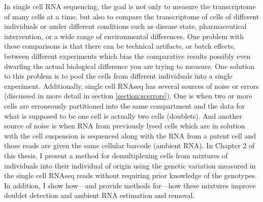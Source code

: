 \par{
In single cell RNA sequencing, the goal is not only to measure the transcriptome of many cells at a time, but also to compare the transcriptome of cells of different individuals or under different conditions such as disease state, pharmaceutical intervention, or a wide range of environmental differences. One problem with these comparisons is that there can be technical artifacts, or batch effects, between different experiments which bias the comparative results possibly even dwarfing the actual biological difference you are trying to measure. One solution to this problem is to pool the cells from different individuals into a single experiment. Additionally, single cell RNAseq has several sources of noise or errors (discussed in more detail in section \ref{section:scerrors}). One is when two or more cells are erroneously partitioned into the same compartment and the data for what is supposed to be one cell is actually two cells (doublets). And another source of noise is when RNA from previously lysed cells which are in solution with the cell suspension is sequenced along with the RNA from a patent cell and those reads are given the same cellular barcode (ambient RNA). In Chapter 2 of this thesis, I present a method for demultiplexing cells from mixtures of individuals into their individual of origin using the genetic variation measured in the single cell RNAseq reads without requiring prior knowledge of the genotypes. In addition, I show how---and provide methods for---how these mixtures improve doublet detection and ambient RNA estimation and removal.
} 

